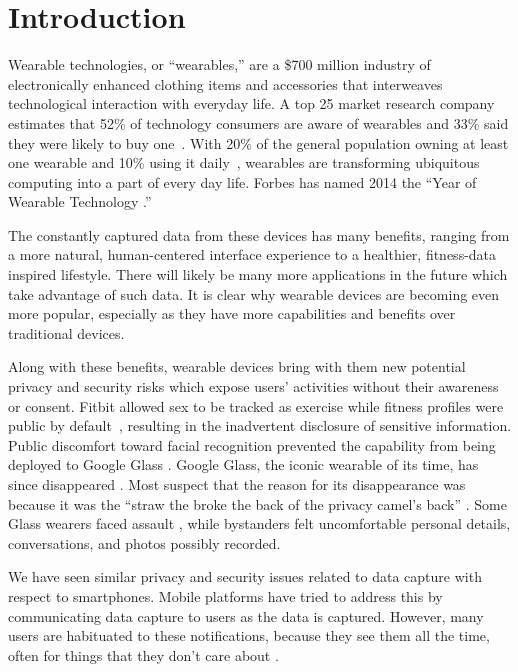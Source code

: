 
\section{Introduction}

Wearable technologies, or ``wearables,'' are a \$700 million industry \cite{cmo} of electronically enhanced clothing items and accessories that interweaves technological interaction with everyday life. A top 25 market research company estimates that 52\% of technology consumers are aware of wearables and 33\% said they were likely to buy one~\cite{NPD}. With 20\% of the general population owning at least one wearable and 10\% using it daily~\cite{WearableStatNews}, wearables are transforming ubiquitous computing into a part of every day life. Forbes has named 2014 the ``Year of Wearable Technology \cite{Forbes}.''

The constantly captured data from these devices has many benefits, ranging from a more natural, human-centered interface experience to a healthier, fitness-data inspired lifestyle. There will likely be many more applications in the future which take advantage of such data. It is clear why wearable devices are becoming even more popular, especially as they have more capabilities and benefits over traditional devices. 

Along with these benefits, wearable devices bring with them new potential privacy and security risks which expose users' activities without their awareness or consent. Fitbit allowed sex to be tracked as exercise while fitness profiles were public by default~\cite{Fitbit}, resulting in the inadvertent disclosure of sensitive information. Public discomfort toward facial recognition prevented the capability from being deployed to Google Glass \cite{GlassDetection}. Google Glass, the iconic wearable of its time, has since disappeared \cite{13_google_2015}. Most suspect that the reason for its disappearance was because it was the ``straw the broke the back of the privacy camel's back'' \cite{14_dvorak_2014}. Some Glass wearers faced assault \cite{1_russell_2014, 15_mashable_2014, 16_gross_2014}, while bystanders felt uncomfortable personal details, conversations, and photos possibly recorded.

We have seen similar privacy \cite{kelley2013privacy, sadeh2009understanding, shklovski2014leakiness} and security issues \cite{enck2011study, felt2011survey} related to data capture with respect to smartphones. Mobile platforms have tried to address this by communicating data capture to users as the data is captured. However, many users are habituated to these notifications, because they see them all the time, often for things that they don't care about \cite{felt2012android}.

